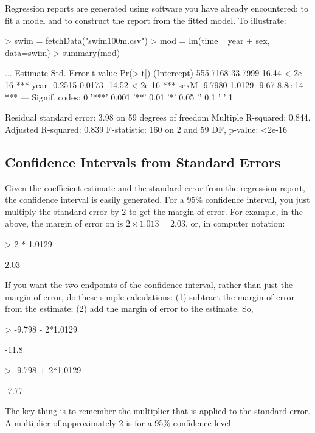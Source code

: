 

 
Regression reports are generated using software you have already encountered:  to fit a model and  to construct the report from
the fitted model.  To illustrate: \datasetSwimming
\begin{Schunk}
\begin{Sinput}
> swim = fetchData("swim100m.csv")
> mod = lm(time ~ year + sex, data=swim)
> summary(mod)
\end{Sinput}
\begin{Soutput}
...
            Estimate Std. Error t value Pr(>|t|)    
(Intercept) 555.7168    33.7999   16.44  < 2e-16 ***
year         -0.2515     0.0173  -14.52  < 2e-16 ***
sexM         -9.7980     1.0129   -9.67  8.8e-14 ***
---
Signif. codes:  0 '***' 0.001 '**' 0.01 '*' 0.05 '.' 0.1 ' ' 1 

Residual standard error: 3.98 on 59 degrees of freedom
Multiple R-squared: 0.844,	Adjusted R-squared: 0.839 
F-statistic:  160 on 2 and 59 DF,  p-value: <2e-16 
\end{Soutput}
\end{Schunk}


\subsection{Confidence Intervals from Standard Errors}


Given the coefficient estimate and the standard error
from the regression report, the confidence interval is easily generated.  
For a 95\% confidence interval, you just multiply the standard error by 2 
to get the margin of error.  For example, in the above, the
margin of error on  is $2 \times 1.013 = 2.03$, or, in 
computer notation:
\begin{Schunk}
\begin{Sinput}
> 2 * 1.0129
\end{Sinput}
\begin{Soutput}
[1] 2.03
\end{Soutput}
\end{Schunk}

If you want the two endpoints of the confidence interval, rather than 
just the margin of error, do these
simple calculations: (1) subtract the margin of error from the estimate; 
(2) add the margin of error to the estimate.  So, 
\begin{Schunk}
\begin{Sinput}
> -9.798 - 2*1.0129
\end{Sinput}
\begin{Soutput}
[1] -11.8
\end{Soutput}
\begin{Sinput}
> -9.798 + 2*1.0129
\end{Sinput}
\begin{Soutput}
[1] -7.77
\end{Soutput}
\end{Schunk}
The key thing is to remember the multiplier that is applied 
to the standard error.  A multiplier of approximately 2 is for
a 95\% confidence level.  

